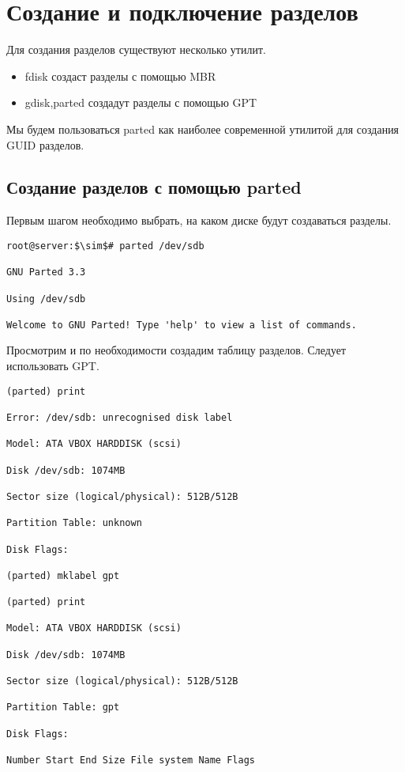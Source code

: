 \documentclass[14pt, a4paper]{article}
\begin{document}
\newpage

\section*{Создание и подключение разделов} 

Для создания разделов существуют несколько утилит.
\begin{itemize}
    \item \colorbox{backcolour}{fdisk} создаст разделы с помощью MBR
    \item \colorbox{backcolour}{gdisk,parted} создадут разделы с помощью GPT
\end{itemize}

Мы будем пользоваться \colorbox{backcolour}{parted} как наиболее современной утилитой для создания GUID разделов.

\subsection*{Создание разделов с помощью parted} 

Первым шагом необходимо выбрать, на каком диске будут создаваться разделы.

\vspace{0.3cm}

\begin{lstlisting}
root@server:$\sim$# parted /dev/sdb

GNU Parted 3.3

Using /dev/sdb

Welcome to GNU Parted! Type 'help' to view a list of commands.

\end{lstlisting}

\vspace{0.2cm}
Просмотрим и по необходимости создадим таблицу разделов. Следует использовать GPT.
\vspace{0.3cm}

\begin{lstlisting}
(parted) print

Error: /dev/sdb: unrecognised disk label

Model: ATA VBOX HARDDISK (scsi)

Disk /dev/sdb: 1074MB

Sector size (logical/physical): 512B/512B

Partition Table: unknown

Disk Flags:

(parted) mklabel gpt

(parted) print

Model: ATA VBOX HARDDISK (scsi)

Disk /dev/sdb: 1074MB

Sector size (logical/physical): 512B/512B

Partition Table: gpt

Disk Flags:

Number Start End Size File system Name Flags

\end{lstlisting}
\end{document}
